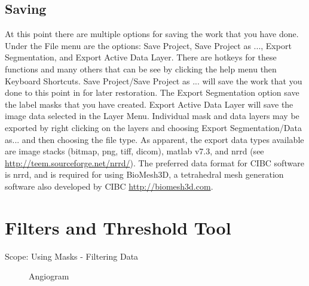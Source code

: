 \documentclass[fleqn,11pt,openany]{book}
\begin{document}
\section{Saving}

At this point there are multiple options for saving the work that you have done.  Under the File menu are the options: Save Project, Save Project as ..., Export Segmentation, and Export Active Data Layer.  There are hotkeys for these functions and many others that can be see by clicking the help menu then Keyboard Shortcuts.  Save Project/Save Project as ... will save the work that you done to this point in for later restoration.  The Export Segmentation option save the label masks that you have created.   Export Active Data Layer will save the image data selected in the Layer Menu.  Individual mask and data layers may be exported by right clicking on the layers and choosing Export Segmentation/Data as... and then choosing the file type.  As apparent, the export data types available are image stacks (bitmap, png, tiff, dicom), matlab v7.3, and nrrd (see \url{http://teem.sourceforge.net/nrrd/}).  The preferred data format for CIBC software is nrrd, and is required for using BioMesh3D, a tetrahedral mesh generation software also developed by CIBC \url{http://biomesh3d.com}.
  
\chapter{Filters and Threshold Tool}

\begin{introduction}
Scope: Using Masks - Filtering Data
\end{introduction}

\begin{figure}
\caption{Angiogram}\label{fig:AngioData}
\end{figure}
\end{document}

